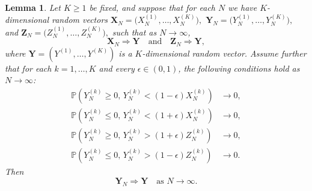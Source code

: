 \documentclass[11pt,twoside,a4paper,reqno]{amsart}
\newtheorem{lemma}[theorem]{Lemma}
\newcommand{\as}[1]{\text{as } #1 \rightarrow\infty}
\begin{document}
\begin{lemma}\label{sandwichhighlem}
Let $K\geq 1$ be fixed, and suppose that for each $N$ we have $K$-dimensional random vectors
$\mathbf{X}_N = \bigl( X_N^{(1)}, \dots, X_N^{(K)} \bigr),$
$\mathbf{Y}_N = \bigl( Y_N^{(1)}, \dots, Y_N^{(K)} \bigr),$ and
$\mathbf{Z}_N = \bigl( Z_N^{(1)}, \dots, Z_N^{(K)} \bigr),$ such that as $N \to \infty$,
$$
\mathbf{X}_N \Rightarrow \mathbf{Y} \quad \text{and} \quad \mathbf{Z}_N \Rightarrow \mathbf{Y},
$$
where $\mathbf{Y} = (Y^{(1)},\dots,Y^{(K)})$ is a $K$-dimensional random vector.
Assume further that for each $k=1,\dots,K$ and every $\epsilon\in (0,1)$, the following conditions hold as $N\rightarrow \infty$:
\begin{equation}\label{MDfYNXN}
\begin{aligned}
\mathbb{P}\left(Y_N^{(k)} \geq 0, \, Y_N^{(k)} < (1 - \epsilon) X_N^{(k)}\right) &\to 0, \\
\mathbb{P}\left(Y_N^{(k)} \leq 0, \, Y_N^{(k)} < (1 + \epsilon) X_N^{(k)}\right) &\to 0, \\
\mathbb{P}\left(Y_N^{(k)} \geq 0, \, Y_N^{(k)} > (1 + \epsilon) Z_N^{(k)}\right) &\to 0, \\
\mathbb{P}\left(Y_N^{(k)} \leq 0, \, Y_N^{(k)} > (1 - \epsilon) Z_N^{(k)}\right) &\to 0.
\end{aligned}
\end{equation}
Then
\begin{equation*}
\mathbf{Y}_N \Rightarrow \mathbf{Y} \quad \as{N}.
\end{equation*}
\end{lemma}
\end{document}

